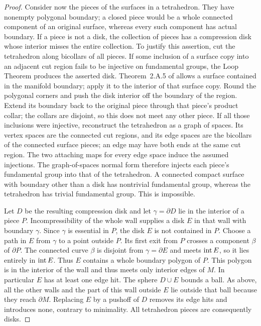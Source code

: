 \begin{proof}
Consider now the pieces of the surfaces in a tetrahedron.  They have nonempty
polygonal boundary; a closed piece would be a whole connected component of
an original surface, whereas every such component has actual boundary.
If a piece is not a disk, the collection of pieces has a compression disk
whose interior misses the entire collection.  To justify this assertion, cut
the tetrahedron along bicollars of all pieces.  If some inclusion of a surface
copy into an adjacent cut region fails to be injective on fundamental groups,
the Loop Theorem produces the asserted disk.  Theorem~2.A.5 of \cite[p.~13]{Stallings1971} allows a surface
contained in the manifold boundary; apply it to the interior of that
surface copy.  Round the polygonal corners and push the
disk interior off the boundary of the region.  Extend its boundary back
to the original piece through that piece's product collar; the collars
are disjoint, so this does not meet any other piece.
If all those inclusions were
injective, reconstruct the tetrahedron as a graph of spaces.  Its vertex
spaces are the connected cut regions, and its edge spaces are the
bicollars of the connected surface pieces; an edge may have both ends
at the same cut region.  The two attaching maps for every edge space
induce the assumed injections.  The graph-of-spaces normal form
therefore injects each piece's fundamental group into that of the
tetrahedron.  A connected compact surface
with boundary other than a disk has nontrivial fundamental group, whereas the
tetrahedron has trivial fundamental group.  This is impossible.

Let $D$ be the resulting compression disk and let $\gamma=\partial D$ lie in
the interior of a piece $P$.  Incompressibility of the whole wall supplies a
disk $E$ in that wall with boundary $\gamma$.  Since $\gamma$ is essential in
$P$, the disk $E$ is not contained in $P$.  Choose a path in $E$ from
$\gamma$ to a point outside $P$.  Its first exit from $P$ crosses a
component $\beta$ of $\partial P$.  The connected curve $\beta$ is
disjoint from $\gamma=\partial E$ and meets $\operatorname{int} E$, so it lies
entirely in $\operatorname{int} E$.  Thus $E$ contains a whole boundary polygon
of $P$.
This polygon is in the interior of the wall and thus meets only interior
edges of $M$.  In particular $E$ has at least one edge hit.  The sphere
$D\cup E$ bounds a ball.  As above, all the other walls and the part of this
wall outside $E$ lie outside that ball because they reach $\partial M$.
Replacing $E$ by a pushoff of $D$ removes its edge hits and introduces none,
contrary to minimality.  All tetrahedron pieces are consequently disks.


\end{proof}
